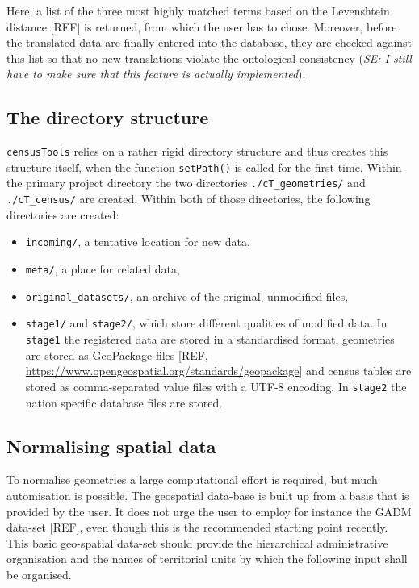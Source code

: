 \documentclass[12pt,]{article}
\providecommand{\tightlist}{%
  \setlength{\itemsep}{0pt}\setlength{\parskip}{0pt}}
\begin{document}
Here, a list of the three most highly matched terms based on the Levenshtein distance {[}REF{]} is returned, from which the user has to chose.
Moreover, before the translated data are finally entered into the database, they are checked against this list so that no new translations violate the ontological consistency (\emph{SE: I still have to make sure that this feature is actually implemented}).

\hypertarget{the-directory-structure}{%
\subsection{The directory structure}\label{the-directory-structure}}

\texttt{censusTools} relies on a rather rigid directory structure and thus creates this structure itself, when the function \texttt{setPath()} is called for the first time.
Within the primary project directory the two directories \texttt{./cT\_geometries/} and \texttt{./cT\_census/} are created.
Within both of those directories, the following directories are created:

\begin{itemize}
\tightlist
\item
  \texttt{incoming/}, a tentative location for new data,
\item
  \texttt{meta/}, a place for related data,
\item
  \texttt{original\_datasets/}, an archive of the original, unmodified files,
\item
  \texttt{stage1/} and \texttt{stage2/}, which store different qualities of modified data. In \texttt{stage1} the registered data are stored in a standardised format, geometries are stored as GeoPackage files {[}REF, \url{https://www.opengeospatial.org/standards/geopackage}{]} and census tables are stored as comma-separated value files with a UTF-8 encoding. In \texttt{stage2} the nation specific database files are stored.
\end{itemize}

\hypertarget{normalising-spatial-data}{%
\subsection{Normalising spatial data}\label{normalising-spatial-data}}

To normalise geometries a large computational effort is required, but much automisation is possible.
The geospatial data-base is built up from a basis that is provided by the user.
It does not urge the user to employ for instance the GADM data-set {[}REF{]}, even though this is the recommended starting point recently.
This basic geo-spatial data-set should provide the hierarchical administrative organisation and the names of territorial units by which the following input shall be organised.
\end{document}
